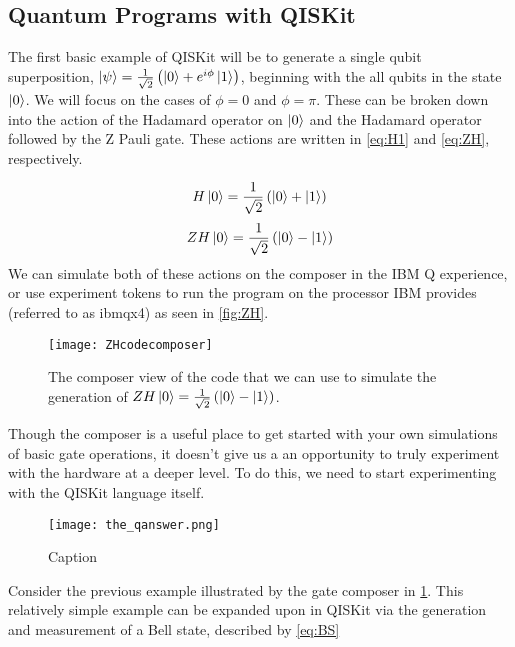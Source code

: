 \subsection*{Quantum Programs with QISKit}

The first basic example of QISKit will be to generate a single qubit superposition, $\left\vert{\psi}\right\rangle=\frac{1}{\sqrt{2}} \left(\left\vert{0}\right\rangle+e^{i\phi}\left\vert{1}\right\rangle\right)$, beginning with the all qubits in the state $\left\vert{0}\right\rangle$. We will focus on the cases of $\phi=0$ and $\phi = \pi$. These can be broken down into the action of the Hadamard operator on $\left\vert{0}\right\rangle$ and the Hadamard operator followed by the Z Pauli gate. These actions are written in \autoref{eq:H1} and \autoref{eq:ZH}, respectively.

\begin{equation}
    H\left\vert{0}\right\rangle=\frac{1}{\sqrt{2}}\left(\left\vert{0}\right\rangle+\left\vert{1}\right\rangle\right)
    \label{eq:H1}
\end{equation}
\begin{equation}
    ZH\ket{0}=\frac{1}{\sqrt{2}}\left(\ket{0}-\ket{1}\right)

    \label{eq:ZH}
\end{equation} 
We can simulate both of these actions on the composer in the IBM Q experience, or use experiment tokens to run the program on the processor IBM provides (referred to as ibmqx4) as seen in \autoref{fig:ZH}. 

\begin{figure}[h!]
    \centering
    \texttt{[image: ZHcodecomposer]}
    \caption{The composer view of the code that we can use to simulate the generation of $ZH\left\vert{0}\right\rangle=\frac{1}{\sqrt{2}}\left(\left\vert{0}\right\rangle-\left\vert{1}\right\rangle\right)$.}
    \label{fig:ZH}
\end{figure}

Though the composer is a useful place to get started with your own simulations of basic gate operations, it doesn't give us a an opportunity to truly experiment with the hardware at a deeper level. To do this, we need to start experimenting with the QISKit language itself.

\begin{figure}
    \centering
    \texttt{[image: the\_qanswer.png]}
    \caption{Caption}
    \label{fig:my_label}
\end{figure}

Consider the previous example illustrated by the gate composer in \ref{fig:ZH}. This relatively simple example can be expanded upon in QISKit via the generation and measurement of a Bell state, described by \autoref{eq:BS}

